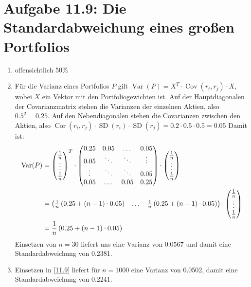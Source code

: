 \documentclass{article}
\DeclareMathOperator{\Var}{Var}
\DeclareMathOperator{\Cov}{Cov}
\DeclareMathOperator{\SD}{SD}
\DeclareMathOperator{\Cor}{Cor}
\begin{document}
	\section*{Aufgabe 11.9: Die Standardabweichung eines großen Portfolios}
	\begin{enumerate}[label=(\alph*)]
		\item offensichtlich 50\%
		\item Für die Varianz eines Portfolios $P$ gilt $\Var(P)=X^T\cdot \Cov(r_i,r_j)\cdot X$, wobei $X$ ein Vektor mit den Portfoliogewichten ist. Auf der Hauptdiagonalen der Covarianzmatrix stehen die Varianzen der einzelnen Aktien, also $0.5^2=0.25$. Auf den Nebendiagonalen stehen die Covarianzen zwischen den Aktien, also $\Cor(r_i,r_j)\cdot \SD(r_i)\cdot \SD(r_j)=0.2\cdot 0.5\cdot 0.5 = 0.05$ Damit ist:
		\begin{align}
			\label{11.9}
			\Var(P) &= \begin{pmatrix}
				\frac{1}{n} \\ \vdots \\ \frac{1}{n}
			\end{pmatrix}^T\cdot \begin{pmatrix}
				0.25 & 0.05 & \dots & 0.05 \\
				0.05 & \ddots & \ddots & \vdots \\
				\vdots & \ddots & \ddots & 0.05 \\
				0.05 & \dots & 0.05 & 0.25
			\end{pmatrix} \cdot \begin{pmatrix}
				\frac{1}{n} \\ \vdots \\ \frac{1}{n}
			\end{pmatrix} \notag \\
			&= \begin{pmatrix}
				\frac{1}{n}\left(0.25+(n-1)\cdot 0.05\right) & \dots & \frac{1}{n}\left(0.25+(n-1)\cdot 0.05\right)
			\end{pmatrix} \cdot \begin{pmatrix}
				\frac{1}{n} \\ \vdots \\ \frac{1}{n}
			\end{pmatrix} \notag \\
			&= \frac{1}{n}\left(0.25 + (n-1)\cdot 0.05\right)
		\end{align}
		Einsetzen von $n=30$ liefert uns eine Varianz von 0.0567 und damit eine Standardabweichung von 0.2381.
		\item Einsetzen in \eqref{11.9} liefert für $n=1000$ eine Varianz von 0.0502, damit eine Standardabweichung von 0.2241.
	\end{enumerate}
\end{document}
